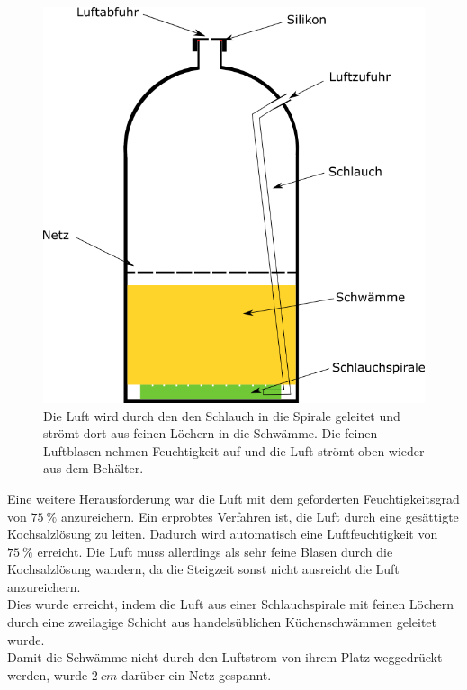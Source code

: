 \begin{figure}[h]
	\begin{center}
		\includegraphics[scale=0.6]{Luftbefeuchter.png}
		\caption{Die Luft wird durch den den Schlauch in die Spirale geleitet und strömt dort aus feinen Löchern in die Schwämme. Die feinen Luftblasen nehmen Feuchtigkeit auf und die Luft strömt oben wieder aus dem Behälter.}
	\end{center}
\end{figure}

Eine weitere Herausforderung war die Luft mit dem geforderten Feuchtigkeitsgrad von $\SI{75}{\%}$ anzureichern. Ein erprobtes Verfahren ist, die Luft durch eine gesättigte Kochsalzlösung zu leiten. Dadurch wird automatisch eine Luftfeuchtigkeit von $\SI{75}{\%}$ erreicht. Die Luft muss allerdings als sehr feine Blasen durch die Kochsalzlösung wandern, da die Steigzeit sonst nicht ausreicht die Luft anzureichern. \\
Dies wurde erreicht, indem die Luft aus einer Schlauchspirale mit feinen Löchern durch eine zweilagige Schicht aus handelsüblichen Küchenschwämmen geleitet wurde. \\
Damit die Schwämme nicht durch den Luftstrom von ihrem Platz weggedrückt werden, wurde $\SI{2}{cm}$ darüber ein Netz gespannt.

